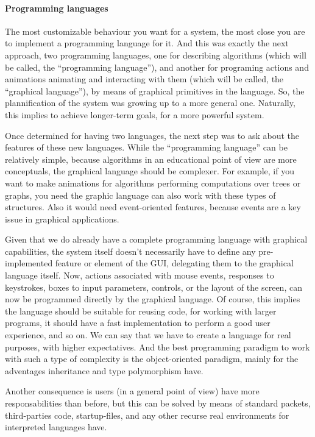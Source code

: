 \documentclass{article}
\begin{document}
\paragraph*{Programming languages}
The most customizable behaviour you want for a system, the most close you are to
implement a programming language for it. And this was exactly the next approach,
two programming languages, one for describing algorithms (which will be called,
the ``programming language''), and another for programing actions and animations
animating and interacting with them (which will be called, the ``graphical
language''), by means of graphical primitives in the language. So, the
plannification of the system was growing up to a more general one. Naturally,
this implies to achieve longer-term goals, for a more powerful system.

Once determined for having two languages, the next step was to ask about the
features of these new languages. While the ``programming language'' can be
relatively simple, because algorithms in an educational point of view are more
conceptuals, the graphical language should be complexer. For example, if you
want to make animations for algorithms performing computations over trees or
graphs, you need the graphic language can also work with these types of
structures. Also it would need event-oriented features, because events are a key
issue in graphical applications.

Given that we do already have a complete programming language with graphical
capabilities, the system itself doesn't necessarily have to define any
pre-implemented feature or element of the GUI, delegating them to the graphical
language itself. Now, actions associated with mouse events, responses to
keystrokes, boxes to input parameters, controls, or the layout of the screen,
can now be programmed directly by the graphical language. Of course, this
implies the language should be suitable for reusing code, for working with
larger programs, it should have a fast implementation to perform a good user
experience, and so on. We can say that we have to create a language for real
purposes, with higher expectatives. And the best programming paradigm to work
with such a type of complexity is the object-oriented paradigm, mainly for the
adventages inheritance and type polymorphism have.

Another consequence is users (in a general point of view) have more
responsabilities than before, but this can be solved by means of standard
packets, third-parties code, startup-files, and any other recurse real
environments for interpreted languages have.
\end{document}
